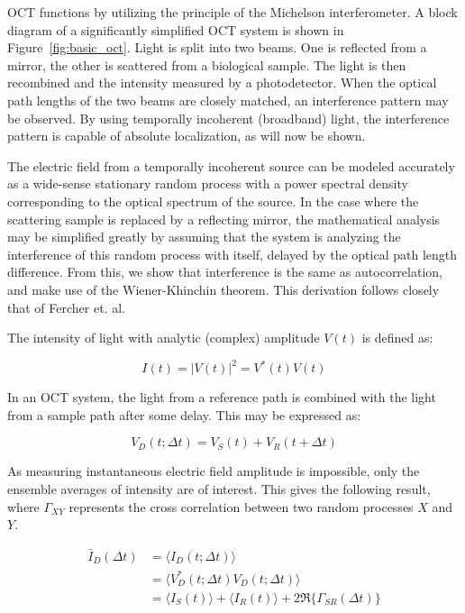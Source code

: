 OCT functions by utilizing the principle of the Michelson interferometer. A block diagram of a significantly simplified OCT system is shown in Figure~\ref{fig:basic_oct}. Light is split into two beams. One is reflected from a mirror, the other is scattered from a biological sample. The light is then recombined and the intensity measured by a photodetector. When the optical path lengths of the two beams are closely matched, an interference pattern may be observed. By using temporally incoherent (broadband) light, the interference pattern is capable of absolute localization, as will now be shown.

The electric field from a temporally incoherent source can be modeled accurately as a wide-sense stationary random process with a power spectral density corresponding to the optical spectrum of the source. \cite{bouma} In the case where the scattering sample is replaced by a reflecting mirror, the mathematical analysis may be simplified greatly by assuming that the system is analyzing the interference of this random process with itself, delayed by the optical path length difference. From this, we show that interference is the same as autocorrelation, and make use of the Wiener-Khinchin theorem. This derivation follows closely that of Fercher et. al. \cite{fercher}

The intensity of light with analytic (complex) amplitude $V(t)$ is defined as:

\begin{equation}
I(t) = |V(t)|^2 = V^*(t)V(t)
\end{equation}

In an OCT system, the light from a reference path is combined with the light from a sample path after some delay. This may be expressed as:

\begin{equation}
V_D(t; \Delta t) = V_S(t) + V_R(t + \Delta t)
\end{equation}

As measuring instantaneous electric field amplitude is impossible, only the ensemble averages of intensity are of interest. This gives the following result, where $\Gamma_{XY}$ represents the cross correlation between two random processes $X$ and $Y$.

\begin{equation}
\begin{aligned}
\bar{I}_D(\Delta t) & =  \langle I_D(t; \Delta t) \rangle \\
& =  \langle V^*_D(t; \Delta t) V_D(t; \Delta t) \rangle \\
& =  \langle I_S(t) \rangle + \langle I_R(t) \rangle + 2 \Re \{\Gamma_{SR} (\Delta t) \}
\end{aligned}
\end{equation}

